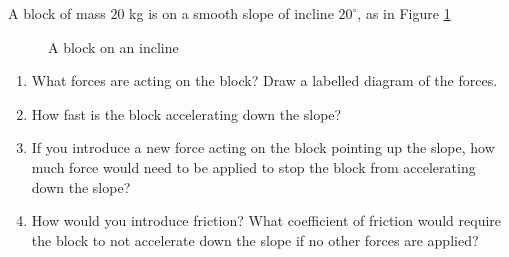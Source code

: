 \begin{example} \label{ex:block-on-plane-no-forces}
    A block of mass $20$ kg is on a smooth slope of incline $20^\circ$, as in Figure \ref{fig:block-on-plane-no-forces}
    \begin{figure}[H]
        \centering
        \caption{A block on an incline}
        \label{fig:block-on-plane-no-forces}
    \end{figure}
    \begin{enumerate}
        \item What forces are acting on the block? Draw a labelled diagram of the forces.
        \item How fast is the block accelerating down the slope?
        \item If you introduce a new force acting on the block pointing up the slope, how much force would need to be applied to stop the block from accelerating down the slope?
        \item How would you introduce friction? What coefficient of friction would require the block to not accelerate down the slope if no other forces are applied?
    \end{enumerate}
\end{example}
